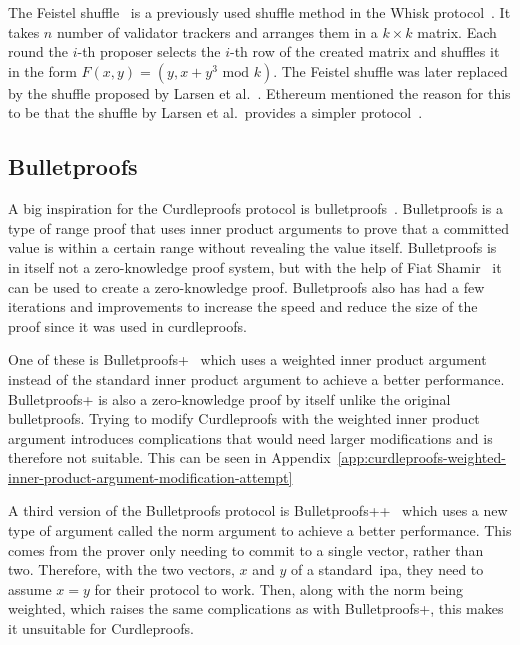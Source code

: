 The Feistel shuffle~\cite{Feistle} is a previously used shuffle method in the Whisk protocol~\cite{Whisk2024}.
It takes $n$ number of validator trackers and arranges them in a $k\times k$ matrix.
Each round the $i$-th proposer selects the $i$-th row of the created matrix and shuffles it in the form $F(x,y)=(y,x+y^3\text{ mod }k)$.
The Feistel shuffle was later replaced by the shuffle proposed by Larsen et al.~\cite{cryptoeprint:2022/560}.
Ethereum mentioned the reason for this to be that the shuffle by Larsen et al.\ provides a simpler protocol~\cite{Whisk2024}.

\subsection{Bulletproofs}\label{subsec:related-work-bulletproofs}
A big inspiration for the Curdleproofs protocol is bulletproofs~\cite{bunz2018bulletproofs}.
Bulletproofs is a type of range proof that uses inner product arguments to prove that a committed value is within a certain range without revealing the value itself.
Bulletproofs is in itself not a zero-knowledge proof system, but with the help of Fiat Shamir~\cite{bunz2018bulletproofs} it can be used to create a zero-knowledge proof.
Bulletproofs also has had a few iterations and improvements to increase the speed and reduce the size of the proof since it was used in curdleproofs.

One of these is Bulletproofs+~\cite{chung2022bulletproofs+} which uses a weighted inner product argument instead of the standard inner product argument to achieve a better performance.
Bulletproofs+ is also a zero-knowledge proof by itself unlike the original bulletproofs.
Trying to modify Curdleproofs with the weighted inner product argument introduces complications that would need larger modifications and is therefore not suitable.
This can be seen in Appendix~\ref{app:curdleproofs-weighted-inner-product-argument-modification-attempt}

A third version of the Bulletproofs protocol is Bulletproofs++~\cite{eagen2024bulletproofs++} which uses a new type of argument called the norm argument to achieve a better performance.
This comes from the prover only needing to commit to a single vector, rather than two.
Therefore, with the two vectors, $x$ and $y$ of a standard~\gls{ipa}, they need to assume $x=y$ for their protocol to work.
Then, along with the norm being weighted, which raises the same complications as with Bulletproofs+, this makes it unsuitable for Curdleproofs.